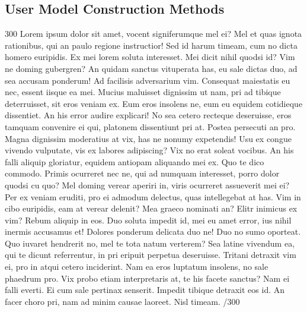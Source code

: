\documentclass{sigchi}
\begin{document}
\subsection{User Model Construction Methods}

300 Lorem ipsum dolor sit amet, vocent signiferumque mel ei? Mel et quas ignota rationibus, qui an paulo regione instructior! Sed id harum timeam, cum no dicta homero euripidis. Ex mei lorem soluta interesset. Mei dicit nihil quodsi id? Vim ne doming gubergren? An quidam sanctus vituperata has, eu sale dictas duo, ad sea accusam ponderum! Ad facilisis adversarium vim. Consequat maiestatis eu nec, essent iisque ea mei. Mucius maluisset dignissim ut nam, pri ad tibique deterruisset, sit eros veniam ex. Eum eros insolens ne, eum eu equidem cotidieque dissentiet. An his error audire explicari! No sea cetero recteque deseruisse, eros tamquam convenire ei qui, platonem dissentiunt pri at. Postea persecuti an pro. Magna dignissim moderatius at vix, has ne nonumy expetendis! Usu ex congue vivendo vulputate, vis ex labores adipiscing? Vix no erat soleat vocibus. An his falli aliquip gloriatur, equidem antiopam aliquando mei ex. Quo te dico commodo. Primis ocurreret nec ne, qui ad numquam interesset, porro dolor quodsi cu quo? Mel doming verear aperiri in, viris ocurreret assueverit mei ei? Per ex veniam eruditi, pro ei admodum delectus, quas intellegebat at has. Vim in cibo euripidis, eam at verear delenit? Mea graeco nominati an? Elitr inimicus ex vim? Rebum aliquip in eos. Duo soluta impedit id, mei eu amet error, ius nihil inermis accusamus et! Dolores ponderum delicata duo ne! Duo no sumo oporteat. Quo iuvaret hendrerit no, mel te tota natum verterem? Sea latine vivendum ea, qui te dicunt referrentur, in pri eripuit perpetua deseruisse. Tritani detraxit vim ei, pro in atqui cetero inciderint. Nam ea eros luptatum insolens, no sale phaedrum pro. Vix probo etiam interpretaris at, te his facete sanctus? Nam ei falli everti. Ei cum sale pertinax senserit. Impedit tibique detraxit eos id. An facer choro pri, nam ad minim causae laoreet. Nisl timeam. /300
\end{document}

